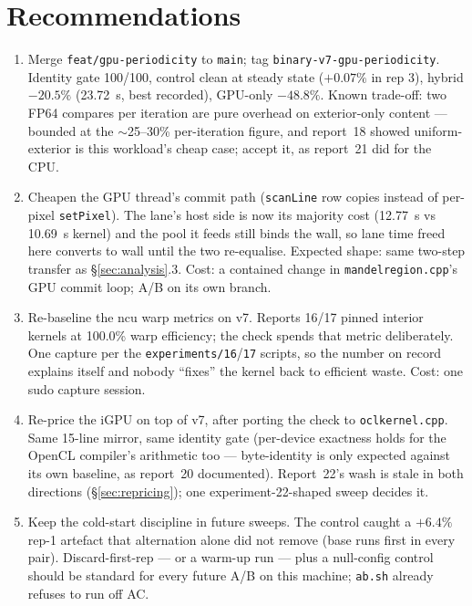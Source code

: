 \documentclass[
	english,
	letterpaper, oneside
]{article}
\begin{document}
\section{Recommendations}
\label{sec:recommendations}

\begin{enumerate}
  \item Merge \texttt{feat/gpu-periodicity} to \texttt{main}; tag
        \texttt{binary-v7-gpu-periodicity}. Identity gate 100/100, control
        clean at steady state ($+0.07\%$ in rep 3), hybrid $-20.5\%$
        (23.72~s, best recorded), GPU-only $-48.8\%$. Known trade-off: two
        FP64 compares per iteration are pure overhead on exterior-only
        content --- bounded at the $\sim$25--30\% per-iteration figure,
        and report~18 showed uniform-exterior is this workload's cheap case;
        accept it, as report~21 did for the CPU.
  \item Cheapen the GPU thread's commit path
        (\texttt{scanLine} row copies instead of per-pixel
        \texttt{setPixel}). The lane's host side is now its majority cost
        (12.77~s vs 10.69~s kernel) and the pool it feeds still binds the
        wall, so lane time freed here converts to wall until the two
        re-equalise. Expected shape: same two-step transfer as
        \S\ref{sec:analysis}.3. Cost: a contained change in
        \texttt{mandelregion.cpp}'s GPU commit loop; A/B on its own branch.
  \item \label{rec:ncu} Re-baseline the ncu warp metrics on v7.
        Reports 16/17 pinned interior kernels at 100.0\% warp efficiency;
        the check spends that metric deliberately. One capture per the
        \texttt{experiments/16}/\texttt{17} scripts, so the number on
        record explains itself and nobody ``fixes'' the kernel back to
        efficient waste. Cost: one sudo capture session.
  \item \label{rec:igpu} Re-price the iGPU on top of v7, after
        porting the check to \texttt{oclkernel.cpp}. Same 15-line mirror,
        same identity gate (per-device exactness holds for the OpenCL
        compiler's arithmetic too --- byte-identity is only expected against
        its own baseline, as report~20 documented). Report~22's wash is
        stale in both directions (\S\ref{sec:repricing}); one
        experiment-22-shaped sweep decides it.
  \item Keep the cold-start discipline in future sweeps. The
        control caught a $+6.4\%$ rep-1 artefact that alternation alone did
        not remove (base runs first in every pair). Discard-first-rep ---
        or a warm-up run --- plus a null-config control should be standard
        for every future A/B on this machine; \texttt{ab.sh} already
        refuses to run off AC.
\end{enumerate}
\end{document}
